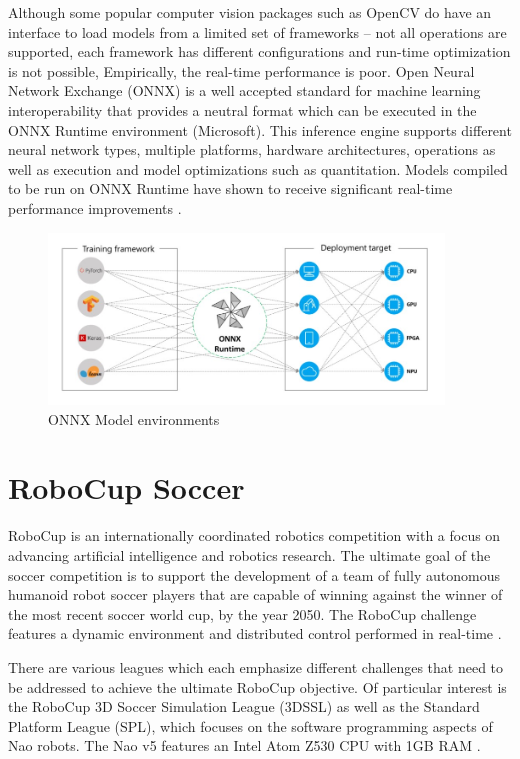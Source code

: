 \documentclass[a4paper,twoside,12pt]{report}
\begin{document}
Although some popular computer vision packages such as OpenCV do have an interface to load models from a limited set of frameworks -- not all operations are supported, each framework has different configurations and run-time optimization is not possible, Empirically, the real-time performance is poor. Open Neural Network Exchange (ONNX) is a well accepted standard \citep{onnx} for machine learning interoperability that provides a neutral format which can be executed in the ONNX Runtime environment (Microsoft). This inference engine supports different neural network types, multiple platforms, hardware architectures, operations as well as execution and model optimizations such as quantitation. Models compiled to be run on ONNX Runtime have shown to receive significant real-time performance improvements \citep{inference}.

\begin{figure}[h!]
\begin{center}
\includegraphics[width=10.5cm]{images/onnx.jpg}
\caption{ONNX Model environments \citep{onnx}}
\label{fig:onnxplot}
\end{center}
\end{figure}

\newpage
\section{RoboCup Soccer}
RoboCup is an internationally coordinated robotics competition with a focus on advancing artificial intelligence and robotics research. The ultimate goal of the soccer competition is to support the development of a team of fully autonomous humanoid robot soccer players that are capable of winning against the winner of the most recent soccer world cup, by the year 2050. The RoboCup challenge features a dynamic environment and distributed control performed in real-time \citep{RoboCupObj}.\

There are various leagues which each emphasize different challenges that need to be addressed to achieve the ultimate RoboCup objective. Of particular interest is the RoboCup 3D Soccer Simulation League (3DSSL) as well as the Standard Platform League (SPL), which focuses on the software programming aspects of Nao robots. The Nao v5 features an Intel Atom Z530 CPU with 1GB RAM \citep{naov5}.
\end{document}
